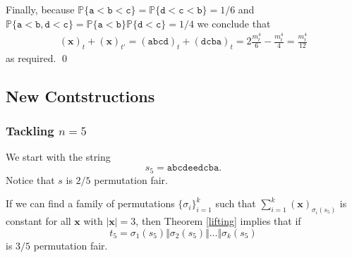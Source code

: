\documentclass[aspectratio=169]{beamer}
\begin{document}
\begin{frame}[triangle=siiblue]
\vfill

Finally, because $\mathbb{P}\{\texttt{a} < \texttt{b} < \texttt{c}\} = \mathbb{P}\{\texttt{d} < \texttt{c} < \texttt{b}\} = 1/6$ and $\mathbb{P}\{\texttt{a} < \texttt{b}, \texttt{d} < \texttt{c}\} = \mathbb{P}\{\texttt{a} < \texttt{b}\}\mathbb{P}\{\texttt{d} < \texttt{c}\} = 1/4$ we conclude that
\begin{align*}
	(\mathbf{x})_t + (\mathbf{x})_{t'}  = (\texttt{abcd})_t + (\texttt{dcba})_t = 2\frac{m_t^4}{6} - \frac{m_t^4}{4}= \frac{m_t^4}{12}
\end{align*}
as required. \qed
\end{frame}

\subsection{New Contstructions}
\begin{frame}[triangle=siiblue]
\frametitle{Tackling $n=5$}
We start with the string
\begin{equation*}
s_5 = \texttt{abcdeedcba}.
\end{equation*}
Notice that $s$ is $2/5$ permutation fair.

\vfill

%

If we can find a family of permutations $\{\sigma_i\}_{i=1}^k$ such that $\sum_{i=1}^k (\mathbf{x})_{\sigma_i(s_5)}$ is constant for all $\mathbf{x}$ with $|\mathbf{x}| = 3$, then Theorem \ref{lifting} implies that if
\begin{equation*}
t_5 = \sigma_1(s_5) \Vert \sigma_2(s_5) \Vert \ldots \Vert \sigma_k(s_5)
\end{equation*}
is $3/5$ permutation fair. 
\end{frame}
\end{document}
